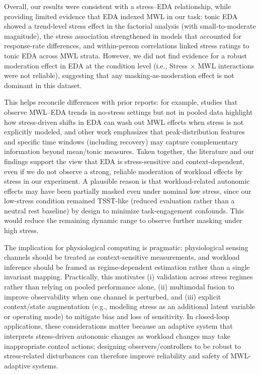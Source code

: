 \documentclass[lettersize,journal]{IEEEtran}
\begin{document}
Overall, our results were consistent with a stress–EDA relationship, while providing limited evidence that EDA indexed MWL in our task: tonic EDA showed a trend-level stress effect in the factorial analysis (with small-to-moderate magnitude), the stress association strengthened in models that accounted for response-rate differences, and within-person correlations linked stress ratings to tonic EDA across MWL strata. However, we did not find evidence for a robust moderation effect in EDA at the condition level (i.e., Stress × MWL interactions were not reliable), suggesting that any masking-as-moderation effect is not dominant in this dataset. 

This helps reconcile differences with prior reports: for example, studies that observe MWL–EDA trends in no-stress settings but not in pooled data highlight how stress-driven shifts in EDA can wash out MWL effects when stress is not explicitly modeled, and other work emphasizes that peak-distribution features and specific time windows (including recovery) may capture complementary information beyond mean/tonic measures. Taken together, the literature and our findings support the view that EDA is stress-sensitive and context-dependent, even if we do not observe a strong, reliable moderation of workload effects by stress in our experiment. A plausible reason is that workload-related autonomic effects may have been partially masked even under nominal low stress, since our low-stress condition remained TSST-like (reduced evaluation rather than a neutral rest baseline) by design to minimize task-engagement confounds. This would reduce the remaining dynamic range to observe further masking under high stress.


The implication for physiological computing is pragmatic: physiological sensing channels should be treated as context-sensitive measurements, and workload inference should be framed as regime-dependent estimation rather than a single invariant mapping. Practically, this motivates (i) validation across stress regimes rather than relying on pooled performance alone, (ii) multimodal fusion to improve observability when one channel is perturbed, and (iii) explicit context/state augmentation (e.g., modeling stress as an additional latent variable or operating mode) to mitigate bias and loss of sensitivity. In closed-loop applications, these considerations matter because an adaptive system that interprets stress-driven autonomic changes as workload changes may take inappropriate control actions; designing observers/controllers to be robust to stress-related disturbances can therefore improve reliability and safety of MWL-adaptive systems.
\end{document}
